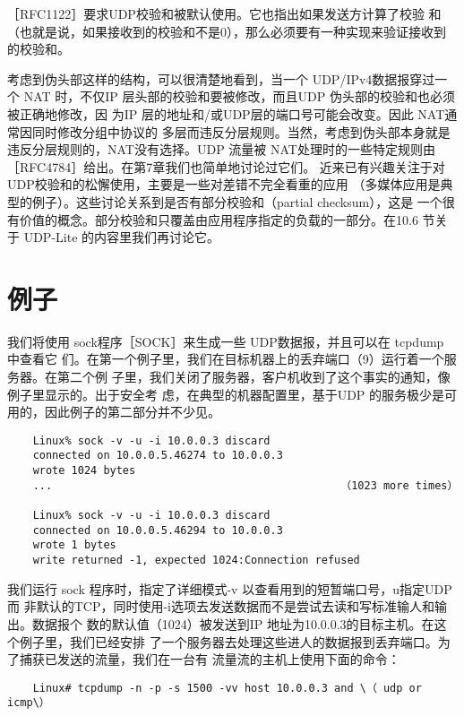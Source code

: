 \begin{tcolorbox}
    ［RFC1122］要求UDP校验和被默认使用。它也指出如果发送方计算了校验
    和（也就是说，如果接收到的校验和不是0），那么必须要有一种实现来验证接收到
    的校验和。
\end{tcolorbox}

考虑到伪头部这样的结构，可以很清楚地看到，当一个 UDP/IPv4数据报穿过一个 NAT
时，不仅IP 层头部的校验和要被修改，而且UDP 伪头部的校验和也必须被正确地修改，因
为IP 层的地址和/或UDP层的端口号可能会改变。因此 NAT通常因同时修改分组中协议的
多层而违反分层规则。当然，考虑到伪头部本身就是违反分层规则的，NAT没有选择。UDP
流量被 NAT处理时的一些特定规则由［RFC4784］给出。在第7章我们也简单地讨论过它们。
近来已有兴趣关注于对 UDP校验和的松懈使用，主要是一些对差错不完全看重的应用
（多媒体应用是典型的例子）。这些讨论关系到是否有部分校验和（partial checksum），这是
一个很有价值的概念。部分校验和只覆盖由应用程序指定的负载的一部分。在10.6 节关于
UDP-Lite 的内容里我们再讨论它。

\section{例子}
我们将使用 sock程序［SOCK］来生成一些 UDP数据报，并且可以在 tcpdump 中查看它
们。在第一个例子里，我们在目标机器上的丢弃端口（9）运行着一个服务器。在第二个例
子里，我们关闭了服务器，客户机收到了这个事实的通知，像例子里显示的。出于安全考
虑，在典型的机器配置里，基于UDP 的服务极少是可用的，因此例子的第二部分并不少见。

\begin{verbatim}
    Linux% sock -v -u -i 10.0.0.3 discard
    connected on 10.0.0.5.46274 to 10.0.0.3
    wrote 1024 bytes
    ...                                             （1023 more times）

    Linux% sock -v -u -i 10.0.0.3 discard
    connected on 10.0.0.5.46294 to 10.0.0.3
    wrote 1 bytes
    write returned -1, expected 1024:Connection refused
\end{verbatim}

我们运行 sock 程序时，指定了详细模式-v 以查看用到的短暂端口号，u指定UDP而
非默认的TCP，同时使用-i选项去发送数据而不是尝试去读和写标准输人和输出。数据报个
数的默认值（1024）被发送到IP 地址为10.0.0.3的目标主机。在这个例子里，我们已经安排
了一个服务器去处理这些进人的数据报到丢弃端口。为了捕获已发送的流量，我们在一台有
流量流的主机上使用下面的命令：

\begin{verbatim}
    Linux# tcpdump -n -p -s 1500 -vv host 10.0.0.3 and \（ udp or icmp\）
\end{verbatim}

